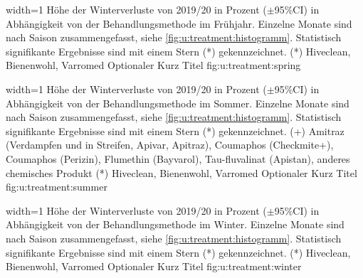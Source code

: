 {width=1\textwidth} %
{Höhe der Winterverluste von 2019/20 in Prozent ($\pm$95\%CI) in Abhängigkeit von der Behandlungsmethode im Frühjahr. Einzelne Monate sind nach Saison zusammengefasst, siehe \cref{fig:u:treatment:histogramm}. Statistisch signifikante Ergebnisse sind mit einem Stern (*) gekennzeichnet.
\newline
(*) Hiveclean, Bienenwohl, Varromed
} %
{Optionaler Kurz Titel} %
{fig:u:treatment:spring} %

{width=1\textwidth} %
{Höhe der Winterverluste von 2019/20 in Prozent ($\pm$95\%CI) in Abhängigkeit von der Behandlungsmethode im Sommer. Einzelne Monate sind nach Saison zusammengefasst, siehe \cref{fig:u:treatment:histogramm}. Statistisch signifikante Ergebnisse sind mit einem Stern (*) gekennzeichnet.
\newline 
(+) Amitraz (Verdampfen und in Streifen, Apivar, Apitraz), Coumaphos (Checkmite+), Coumaphos (Perizin), Flumethin (Bayvarol), Tau-fluvalinat (Apistan), anderes chemisches Produkt  
\newline
(*) Hiveclean, Bienenwohl, Varromed}
{Optionaler Kurz Titel} %
{fig:u:treatment:summer} %

{width=1\textwidth} %
{Höhe der Winterverluste von 2019/20 in Prozent ($\pm$95\%CI) in Abhängigkeit von der Behandlungsmethode im Winter. Einzelne Monate sind nach Saison zusammengefasst, siehe \cref{fig:u:treatment:histogramm}. Statistisch signifikante Ergebnisse sind mit einem Stern (*) gekennzeichnet.
\newline 
(*) Hiveclean, Bienenwohl, Varromed}
{Optionaler Kurz Titel} %
{fig:u:treatment:winter} %

\label{sss:drohnenbrutentahme:u}

